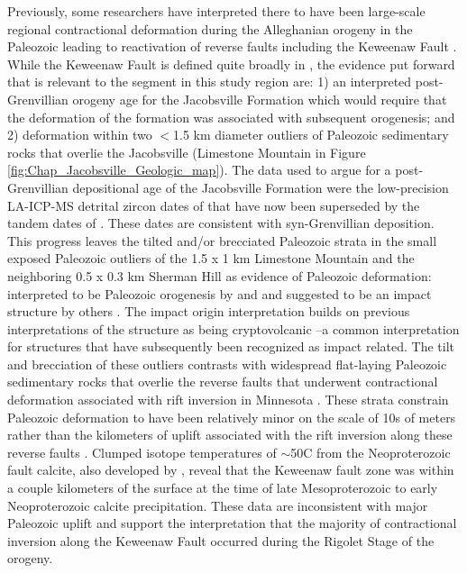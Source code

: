Previously, some researchers have interpreted there to have been large-scale regional contractional deformation during the Alleghanian orogeny in the Paleozoic leading to reactivation of reverse faults including the Keweenaw Fault \citep{Craddock2017a}. While the Keweenaw Fault is defined quite broadly in \cite{Craddock2017a}, the evidence put forward that is relevant to the segment in this study region are: 1) an interpreted post-Grenvillian orogeny age for the Jacobsville Formation which would require that the deformation of the formation was associated with subsequent orogenesis; and 2) deformation within two $<$1.5 km diameter outliers of Paleozoic sedimentary rocks that overlie the Jacobsville (Limestone Mountain in Figure \ref{fig:Chap_Jacobsville_Geologic_map}). The data used to argue for a post-Grenvillian depositional age of the Jacobsville Formation were the low-precision LA-ICP-MS detrital zircon dates of \cite{Malone2016a} that have now been superseded by the tandem dates of \cite{Hodgin2022a}. These dates are consistent with syn-Grenvillian deposition. This progress leaves the tilted and/or brecciated Paleozoic strata in the small exposed Paleozoic outliers of the 1.5 x 1 km Limestone Mountain and the neighboring 0.5 x 0.3 km Sherman Hill as evidence of Paleozoic deformation: interpreted to be Paleozoic orogenesis by \cite{Hamblin1958a} and \cite{Craddock2017a} and suggested to be an impact structure by others \citep{Milstein1987a}. The impact origin interpretation builds on previous interpretations of the structure as being cryptovolcanic \citep{Cannon1981a}--a common interpretation for structures that have subsequently been recognized as impact related. The tilt and brecciation of these outliers contrasts with widespread flat-laying Paleozoic sedimentary rocks that overlie the reverse faults that underwent contractional deformation associated with rift inversion in Minnesota \citep{Jirsa2011a}. These strata constrain Paleozoic deformation to have been relatively minor on the scale of 10s of meters rather than the kilometers of uplift associated with the rift inversion along these reverse faults \citep{Boerboom2018a}. Clumped isotope temperatures of $\sim$50\textdegree C from the Neoproterozoic fault calcite, also developed by \cite{Hodgin2022a}, reveal that the Keweenaw fault zone was within a couple kilometers of the surface at the time of late Mesoproterozoic to early Neoproterozoic calcite precipitation. These data are inconsistent with major Paleozoic uplift and support the interpretation that the majority of contractional inversion along the Keweenaw Fault occurred during the Rigolet Stage of the orogeny. 

